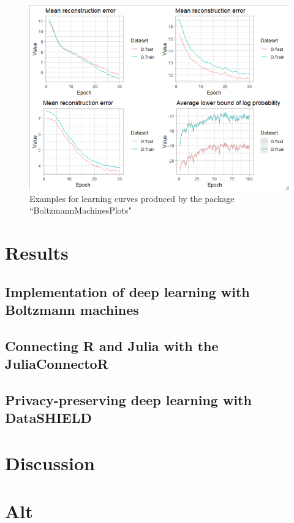 \documentclass[12pt]{article}
\begin{document}
 
\begin{figure}[h]
   \centering
   \includegraphics[scale=0.4,trim={0.1cm 0 0 0.1cm},clip]{images/dsBoltzmannLearningcurves.png}
   \caption{Examples for learning curves produced by the package ``BoltzmannMachinesPlots"}
 \end{figure}
 

\section{Results}
\subsection{Implementation of deep learning with Boltzmann machines}
\subsection{Connecting R and Julia with the JuliaConnectoR}
\subsection{Privacy-preserving deep learning with DataSHIELD}


\section{Discussion}




\section{Alt}
\end{document}
